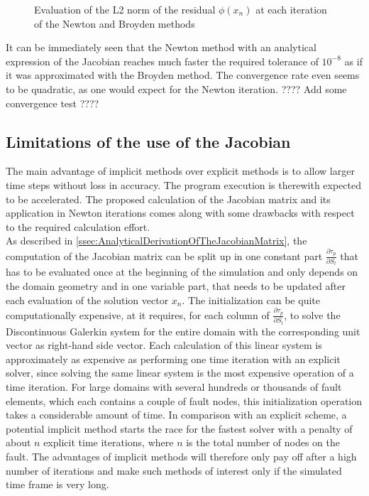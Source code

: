 \begin{figure}[H]
\begin{subfigure}{0.32\textwidth}
 	\end{subfigure}
 	\caption{Evaluation of the L2 norm of the residual $\phi(x_n)$ at each iteration of the Newton and Broyden methods}
 	\label{fig:convergenceNewtonAndBroyden}
 \end{figure}
 It can be immediately seen that the Newton method with an analytical expression of the Jacobian reaches much faster the required tolerance of $10^{-8}$ as if it was approximated with the Broyden method. The convergence rate even seems to be quadratic, as one would expect for the Newton iteration. ???? Add some convergence test ????


\subsection{Limitations of the use of the Jacobian}
The main advantage of implicit methods over explicit methods is to allow larger time steps without loss in accuracy. The program execution is therewith expected to be accelerated. The proposed calculation of the Jacobian matrix and its application in Newton iterations comes along with some drawbacks with respect to the required calculation effort. \\
As described in \autoref{ssec:AnalyticalDerivationOfTheJacobianMatrix}, the computation of the Jacobian matrix can be split up in one constant part $\frac{\partial \tau_p}{\partial S_l}$ that has to be evaluated once at the beginning of the simulation and only depends on the domain geometry and in one variable part, that needs to be updated after each evaluation of the solution vector $x_n$. The initialization can be quite computationally expensive, at it requires, for each column of $\frac{\partial \tau_p}{\partial S_l}$, to solve the Discontinuous Galerkin system for the entire domain with the corresponding unit vector as right-hand side vector. Each calculation of this linear system is approximately as expensive as performing one time iteration with an explicit solver, since solving the same linear system is the most expensive operation of a time iteration. For large domains with several hundreds or thousands of fault elements, which each contains a couple of fault nodes, this initialization operation takes a considerable amount of time. In comparison with an explicit scheme, a potential implicit method starts the race for the fastest solver with a penalty of about $n$ explicit time iterations, where $n$ is the total number of nodes on the fault. The advantages of implicit methods will therefore only pay off after a high number of iterations and make such methods of interest only if the simulated time frame is very long. \\
